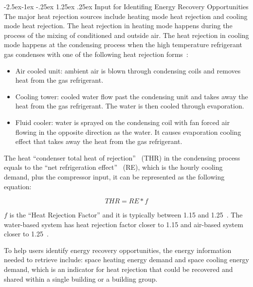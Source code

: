 \documentclass[hidelinks,12pt]{article}
\makeatletter
\renewcommand\paragraph{\@startsection{paragraph}{4}{\z@}%
            {-2.5ex\@plus -1ex \@minus -.25ex}%
            {1.25ex \@plus .25ex}%
            {\normalfont\normalsize\bfseries}}
\makeatother
\begin{document}
\paragraph{Input for Identifing Energy Recovery Opportunities}
The major heat rejection sources include heating mode heat rejection
and cooling mode heat rejection. The heat rejection in heating mode
happens during the process of the mixing of conditioned and outside
air. The heat rejection in cooling mode happens at the condensing
process when the high temperature refrigerant gas condenses with one
of the following heat rejection forms~\cite{Bhatia2015}:
\begin{itemize}
\item Air cooled unit: ambient air is blown through condensing coils
  and removes heat from the gas refrigerant.
\item Cooling tower: cooled water flow past the condensing unit and
  takes away the heat from the gas refrigerant. The water is then
  cooled through evaporation.
\item Fluid cooler: water is sprayed on the condensing coil with fan
  forced air flowing in the opposite direction as the water. It
  causes evaporation cooling effect that takes away the heat from the
  gas refrigerant. 
\end{itemize}
The heat ``condenser total heat of rejection''~\cite{Bhatia2015} (THR)
in the condensing process equals to the ``net refrigeration effect''
~\cite{Bhatia2015}(RE), which is the hourly cooling demand, plus the
compressor input, it can be represented as the following equation:

$$THR = RE * f$$

$f$ is the ``Heat Rejection Factor'' and it is typically between 1.15
and 1.25~\cite{Bhatia2015}. The water-based system has heat rejection
factor closer to 1.15 and air-based system closer to
1.25~\cite{Bhatia2015}.

To help users identify energy recovery opportunities, the energy
information needed to retrieve include: space heating energy demand
and space cooling energy demand, which is an indicator for heat
rejection that could be recovered and shared within a single building
or a building group.
\end{document}
